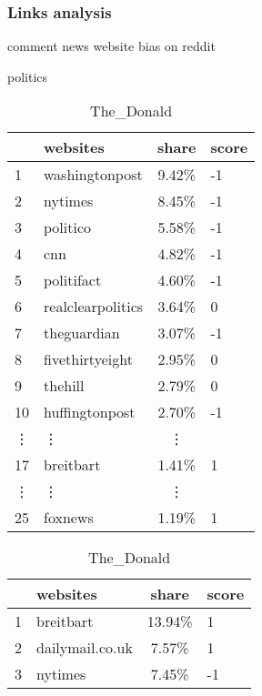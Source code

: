 \documentclass[runningheads,a4paper]{llncs}
\begin{document}
	\subsubsection{Links analysis}
	\begin{table}%
		\centering
		\caption{comment news website bias on reddit}\label{table:linksbias}
		\begin{subtable}{0.5\textwidth}%
			\centering
			\caption{politics}\label{table:linksbias-pol}
			\begin{tabular}{l|l|c|l}%
				& websites & share & score\\
				\hline
				\rowcolor{democratic}
				1 & washingtonpost & 9.42\% &	-1\\
				\rowcolor{democratic}
				2 & nytimes & 8.45\% &	-1\\
				\rowcolor{democratic}
				3 & politico & 5.58\% &	-1\\
				\rowcolor{democratic}
				4 & cnn & 4.82\% &	-1\\
				\rowcolor{neutral}
				5 & politifact & 4.60\% &	-1\\
				\rowcolor{neutral}
				6 & realclearpolitics &	3.64\% &	0\\
				\rowcolor{democratic}
				7 & theguardian & 3.07\% &	-1\\
				\rowcolor{neutral}
				8 & fivethirtyeight &2.95\% &	0\\
				\rowcolor{neutral}
				9 & thehill & 2.79\% & 0\\
				\rowcolor{democratic}
				10 & huffingtonpost & 2.70\% & -1\\
				\vdots & \vdots & \vdots \\
				\rowcolor{republican}
				17 & breitbart & 1.41\% & 1\\
				\vdots & \vdots & \vdots \\
				\rowcolor{republican}
				25 & foxnews & 1.19\% & 1
			\end{tabular}%
		\end{subtable}%
		\begin{subtable}{0.5\textwidth}%
			\centering
			\caption{The\_Donald}\label{table:linksbias-don}
			\begin{tabular}{l|l|c|l}%
				& websites & share & score\\
				\hline
				\rowcolor{republican}
				1 & breitbart &	13.94\%  &	1\\
				\rowcolor{republican}
				2 & dailymail.co.uk &	7.57\% &	1\\
				\rowcolor{democratic}
				3 & nytimes &	7.45\% &	-1\\

\end{tabular}
\end{subtable}
\end{table}
\end{document}
